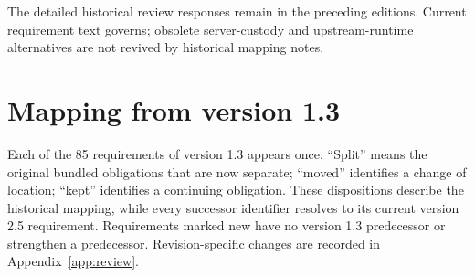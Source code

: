 \documentclass[11pt,a4paper]{article}
\begin{document}
The detailed historical review responses remain in the preceding editions. Current requirement text governs; obsolete server-custody and upstream-runtime alternatives are not revived by historical mapping notes.


\section{Mapping from version 1.3}\label{app:mapping}
Each of the 85 requirements of version 1.3 appears once. ``Split'' means the original bundled obligations that are now separate; ``moved'' identifies a change of location; ``kept'' identifies a continuing obligation. These dispositions describe the historical mapping, while every successor identifier resolves to its current version 2.5 requirement. Requirements marked new have no version 1.3 predecessor or strengthen a predecessor. Revision-specific changes are recorded in Appendix~\ref{app:review}.

\end{document}

